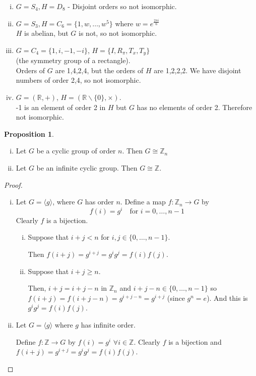 \documentclass{article}
\theoremstyle{definition} \newtheorem*{definition}{Definition}
\newtheorem{proposition}[theorem]{Proposition}
\newcommand{\reals}{\mathbb{R}} \newcommand{\rationals}{\mathbb{Q}}
\newcommand{\but}[2]{#1 \backslash \{#2\}} \newcommand{\A}{\mathcal{A}}
\newcommand{\ism}{\cong} \newcommand{\elemt}[2]{#1_{{#2}\sigma(#2)}}
\begin{document}
\begin{exmps}\hfill \begin{enumerate}[(i)] \item $G=S_4, H=D_8$ - Disjoint orders so
        not isomorphic.  \item $G=S_3, H=C_6=\{1,w,\ldots,w^5\}$ where
        $w=e^{\frac{2 \pi i}{6}}$\\ $H$ is abelian, but $G$ is not, so not
      isomorphic.  \item $G=C_4=\{1,i,-1,-i\}$, $H=\{I,R_\pi,T_x,T_y\}$ \\(the
        symmetry group of a rectangle). \\ Orders of $G$ are 1,4,2,4, but the
        orders of $H$ are 1,2,2,2. We have disjoint numbers of order 2,4, so
        not isomorphic.  \item $G=(\mathbb{R}, +)$, $H=(\but{\reals}{0},
          \times).$\\ -1 is an element of order 2 in $H$ but $G$ has no
          elements of order 2. Therefore not isomorphic.\\ \end{enumerate}
    \end{exmps}

\begin{proposition}\hfill \begin{enumerate}[(i)] \item Let $G$ be a cyclic group of
        order $n$. Then $G \ism \mathbb{Z}_n$ \item Let $G$ be an infinite
          cyclic group. Then $G \ism \mathbb{Z}$.  \end{enumerate}
    \end{proposition}

\begin{proof}\hfill \begin{enumerate}[(i)] \item Let $G=\langle g \rangle$, where
          $G$ has order $n$. Define a map $f : \mathbb{Z}_n \rightarrow G$ by
          $$f(i)=g^i \quad \text{for } i=0,\ldots,n-1$$ Clearly $f$ is a
          bijection.  \begin{enumerate}[(i)] \item Suppose that $i+j<n$ for $i,j \in
              \{0,\ldots,n-1\}.$ 
            
              Then $f(i+j)=g^{i+j}=g^i g^j = f(i)f(j)$.
            \item Suppose that $i+j \geq n$. 
              
              Then, $i+j = i+j-n$ in  $\mathbb{Z}_n$ and $i+j-n \in \{0,\ldots,n-1\}$ so
              $f(i+j)=f(i+j-n)=g^{i+j-n}=g^{i+j}$ (since $g^n=e$).  And this is
            $g^i g^j = f(i) f(j)$.  \end{enumerate} \item Let $G=\langle g
          \rangle$ where $g$ has infinite order. 
          
          Define $f : \mathbb{Z}
          \rightarrow G$ by $f(i)=g^i$ $\forall i \in \mathbb{Z}$. Clearly $f$
          is a bijection and $f(i+j)=g^{i+j}=g^i g^j = f(i) f(j)$.
      \end{enumerate} \end{proof}
\end{document}
